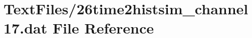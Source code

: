 \hypertarget{26time2histsim__channel17_8dat}{}\section{Text\+Files/26time2histsim\+\_\+channel17.dat File Reference}
\label{26time2histsim__channel17_8dat}
